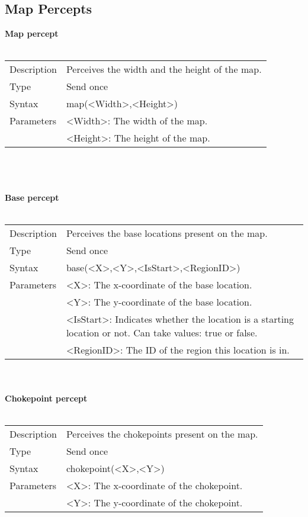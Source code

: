 \documentclass[english,11pt]{report}
\begin{document}
\subsection{Map Percepts}
\textbf{Map percept}\\
\\
\begin{tabularx}{\textwidth}{lX}
 Description & Perceives the width and the height of the map. \\
 Type & Send once \\
 Syntax & map(<Width>,<Height>) \\
 Parameters &   <Width>: The width of the map.\\
            &   <Height>: The height of the map.
\end{tabularx}\\
\\
\\
\newpage
\noindent
\textbf{Base percept}\\
\\
\begin{tabularx}{\textwidth}{lX}
 Description & Perceives the base locations present on the map. \\
 Type & Send once \\
 Syntax & base(<X>,<Y>,<IsStart>,<RegionID>) \\
 Parameters &        <X>: The x-coordinate of the base location.\\
            &        <Y>: The y-coordinate of the base location.\\
            &  <IsStart>: Indicates whether the location is a starting location or not. Can take values: true or false. \\
            & <RegionID>: The ID of the region this location is in.
\end{tabularx}\\
\\
\textbf{Chokepoint percept}\\
\\
\begin{tabularx}{\textwidth}{lX}
 Description & Perceives the chokepoints present on the map. \\
 Type & Send once \\
 Syntax & chokepoint(<X>,<Y>) \\
 Parameters &   <X>: The x-coordinate of the chokepoint. \\
            &   <Y>: The y-coordinate of the chokepoint.
\end{tabularx}\\
\\
\\
\end{document}
